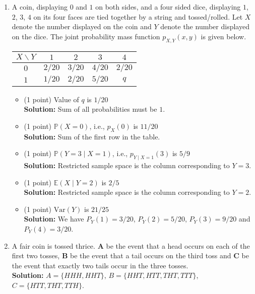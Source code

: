 \documentclass[11pt]{article}
\newcommand{\bkt}[1]{\left( #1\right)}
\newcommand{\Eb}{\mathbb{E}}
\newcommand{\Pb}{\mathbb{P}}
\newcommand{\point}{(1 point) }
\newcommand{\fillans}[1]{\hfill$\boxed{#1}$}
\newcommand{\soln}[1]{\textbf{Solution:} #1}
\begin{document}
\begin{enumerate}
\begin{itemize}
{		}
	\end{itemize}
	\item
	A coin, displaying $0$ and $1$ on both sides, and a four sided dice, displaying $1$, $2$, $3$, $4$ on its four faces are tied together by a string and tossed/rolled. Let $X$ denote the number displayed on the coin and $Y$ denote the number displayed on the dice. The joint probability mass function $p_{X,Y}\bkt{x,y}$ is given below.
	\begin{center}
		\begin{tabular}{|c|c|c|c|c|}
			\hline
			$X \backslash Y$& $1$ & $2$ & $3$ & $4$\\
			\hline
			$0$ & $2/20$ & $3/20$ & $4/20$ & $2/20$\\
			\hline
			$1$ & $1/20$ & $2/20$ & $5/20$ & $q$\\
			\hline
		\end{tabular}
	\end{center}
	\begin{itemize}
		\item
		\point Value of $q$ is \fillans{1/20}\\
		\soln{
		Sum of all probabilities must be $1$.
		}
		\item
		\point $\Pb(X=0)$, i.e., $p_X(0)$ is \fillans{11/20}\\
		\soln{Sum of the first row in the table.}
		\item
		\point $\Pb(Y=3 \mid X=1)$, i.e., $p_{Y\mid X=1}(3)$ is \fillans{5/9}\\
		\soln{Restricted sample space is the column corresponding to $Y=3$.}
		\item
		\point $\Eb\bkt{X \mid Y=2}$ is \fillans{2/5}\\
		\soln{Restricted sample space is the column corresponding to $Y=2$.}
		\item
		\point $\text{Var}\bkt{Y}$ is \fillans{21/25}\\
		\soln{
		We have $P_Y(1) = 3/20$, $P_Y(2) = 5/20$, $P_Y(3) = 9/20$ and $P_Y(4) = 3/20$.
		}
	\end{itemize}
	\item
	A fair coin is tossed thrice. $\mathbf{A}$ be the event that a head occurs on each of the first two tosses, $\mathbf{B}$ be the event that a tail occurs on the third toss and $\mathbf{C}$ be the event that exactly two tails occur in the three tosses.\\
	\soln{$A = \{HHH,HHT\}$, $B = \{HHT,HTT,THT,TTT\}$, $C = \{HTT,THT,TTH\}$.}
	\begin{itemize}

\end{itemize}
\end{enumerate}
\end{document}
